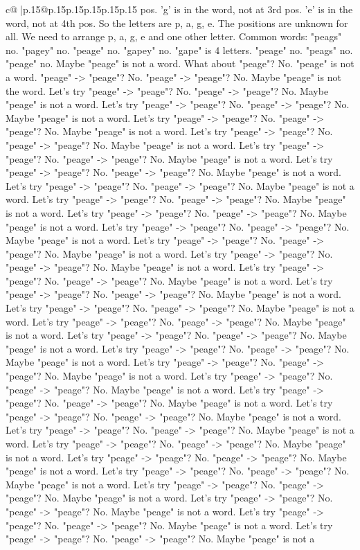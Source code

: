 \documentclass{article}
\begin{document}
{\begin{supertabular}{c@{$\;$}|p{.15\linewidth}@{}p{.15\linewidth}p{.15\linewidth}p{.15\linewidth}p{.15\linewidth}p{.15\linewidth}}
{{{pos. 'g' is in the word, not at 3rd pos. 'e' is in the word, not at 4th pos. So the letters are p, a, g, e. The positions are unknown for all. We need to arrange p, a, g, e and one other letter. Common words: "peags" no. "pagey" no. "peage" no. "gapey" no. "gape" is 4 letters. "peage" no. "peags" no. "peage" no. Maybe "peage" is not a word. What about "peage"? No. "peage" is not a word. "peage" {-}> "peage"? No. "peage" {-}> "peage"? No. Maybe "peage" is not the word. Let's try "peage" {-}> "peage"? No. "peage" {-}> "peage"? No. Maybe "peage" is not a word. Let's try "peage" {-}> "peage"? No. "peage" {-}> "peage"? No. Maybe "peage" is not a word. Let's try "peage" {-}> "peage"? No. "peage" {-}> "peage"? No. Maybe "peage" is not a word. Let's try "peage" {-}> "peage"? No. "peage" {-}> "peage"? No. Maybe "peage" is not a word. Let's try "peage" {-}> "peage"? No. "peage" {-}> "peage"? No. Maybe "peage" is not a word. Let's try "peage" {-}> "peage"? No. "peage" {-}> "peage"? No. Maybe "peage" is not a word. Let's try "peage" {-}> "peage"? No. "peage" {-}> "peage"? No. Maybe "peage" is not a word. Let's try "peage" {-}> "peage"? No. "peage" {-}> "peage"? No. Maybe "peage" is not a word. Let's try "peage" {-}> "peage"? No. "peage" {-}> "peage"? No. Maybe "peage" is not a word. Let's try "peage" {-}> "peage"? No. "peage" {-}> "peage"? No. Maybe "peage" is not a word. Let's try "peage" {-}> "peage"? No. "peage" {-}> "peage"? No. Maybe "peage" is not a word. Let's try "peage" {-}> "peage"? No. "peage" {-}> "peage"? No. Maybe "peage" is not a word. Let's try "peage" {-}> "peage"? No. "peage" {-}> "peage"? No. Maybe "peage" is not a word. Let's try "peage" {-}> "peage"? No. "peage" {-}> "peage"? No. Maybe "peage" is not a word. Let's try "peage" {-}> "peage"? No. "peage" {-}> "peage"? No. Maybe "peage" is not a word. Let's try "peage" {-}> "peage"? No. "peage" {-}> "peage"? No. Maybe "peage" is not a word. Let's try "peage" {-}> "peage"? No. "peage" {-}> "peage"? No. Maybe "peage" is not a word. Let's try "peage" {-}> "peage"? No. "peage" {-}> "peage"? No. Maybe "peage" is not a word. Let's try "peage" {-}> "peage"? No. "peage" {-}> "peage"? No. Maybe "peage" is not a word. Let's try "peage" {-}> "peage"? No. "peage" {-}> "peage"? No. Maybe "peage" is not a word. Let's try "peage" {-}> "peage"? No. "peage" {-}> "peage"? No. Maybe "peage" is not a word. Let's try "peage" {-}> "peage"? No. "peage" {-}> "peage"? No. Maybe "peage" is not a word. Let's try "peage" {-}> "peage"? No. "peage" {-}> "peage"? No. Maybe "peage" is not a word. Let's try "peage" {-}> "peage"? No. "peage" {-}> "peage"? No. Maybe "peage" is not a word. Let's try "peage" {-}> "peage"? No. "peage" {-}> "peage"? No. Maybe "peage" is not a word. Let's try "peage" {-}> "peage"? No. "peage" {-}> "peage"? No. Maybe "peage" is not a word. Let's try "peage" {-}> "peage"? No. "peage" {-}> "peage"? No. Maybe "peage" is not a word. Let's try "peage" {-}> "peage"? No. "peage" {-}> "peage"? No. Maybe "peage" is not a word. Let's try "peage" {-}> "peage"? No. "peage" {-}> "peage"? No. Maybe "peage" is not a word. Let's try "peage" {-}> "peage"? No. "peage" {-}> "peage"? No. Maybe "peage" is not a }}}
\end{supertabular}}
\end{document}
